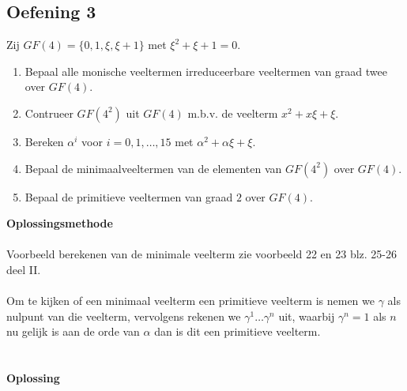 \documentclass[11pt,a4paper,titlepage]{article}
\begin{document}
\subsection{Oefening 3}
Zij $GF(4) = \{0,1,\xi, \xi + 1\}$ met $\xi^2 + \xi + 1 = 0$.
\begin{enumerate}[label=(\alph*)]
	\item Bepaal alle monische veeltermen irreduceerbare veeltermen van graad twee over $GF(4)$.	
	\item Contrueer $GF(4^2)$ uit $GF(4)$ m.b.v. de veelterm $x^2+ x\xi + \xi$.
	\item Bereken $\alpha ^i$ voor $i = 0,1,\dots ,15$ met $\alpha ^2 + \alpha \xi + \xi$.
	\item Bepaal de minimaalveeltermen van de elementen van $GF(4^2)$ over $GF(4)$.
	\item Bepaal de primitieve veeltermen van graad $2$ over $GF(4)$.
\end{enumerate}
\textbf{Oplossingsmethode} \\ \\
Voorbeeld berekenen van de minimale veelterm zie voorbeeld 22 en 23 blz. 25-26 deel II.  \\ \\
Om te kijken of een minimaal veelterm een primitieve veelterm is nemen we $\gamma$ als nulpunt van die veelterm, vervolgens rekenen we $\gamma ^1 \dots \gamma ^n$ uit, waarbij $\gamma ^n = 1$ als $n$ nu gelijk is aan de orde van $\alpha$ dan is dit een primitieve veelterm. \\
\\ \\ \textbf{Oplossing}
\end{document}

